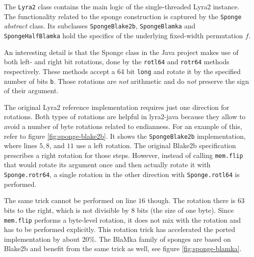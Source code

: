 The \texttt{Lyra2} class contains the main logic of the single-threaded Lyra2 instance. The functionality related to the sponge construction is captured by the \texttt{Sponge} \emph{abstract} class. Its subclasses \texttt{SpongeBlake2b}, \texttt{SpongeBlamka} and \texttt{SpongeHalfBlamka} hold the specifics of the underlying fixed-width permutation \(f\).

An interesting detail is that the Sponge class in the Java project makes use of both left- and right bit rotations, done by the \texttt{rotl64} and \texttt{rotr64} methods respectively. These methods accept a 64 bit \texttt{long} and rotate it by the specified number of bits \texttt{b}. Those rotations are \emph{not} arithmetic and do \emph{not} preserve the sign of their argument.

The original Lyra2 reference implementation requires just one direction for rotations. Both types of rotations are helpful in lyra2-java because they allow to avoid a number of byte rotations related to endianness. For an example of this,  refer to figure \ref{fig:sponge-blake2b}. It shows the \texttt{SpongeBlake2b} implementation, where lines \(5, 8\), and \(11\) use a left rotation. The original Blake2b specification prescribes a right rotation for those steps. However, instead of calling \texttt{mem.flip} that would rotate its argument once and then actually rotate it with \texttt{Sponge.rotr64}, a single rotation in the other direction with \texttt{Sponge.rotl64} is performed.

The same trick cannot be performed on line \(16\) though. The rotation there is \(63\) bits to the right, which is not divisible by 8 bits (the size of one byte). Since \texttt{mem.flip} performs a byte-level rotation, it does not mix with the rotation and has to be performed explicitly. This rotation trick has accelerated the ported implementation by about 20\%. The BlaMka family of sponges are based on Blake2b and benefit from the same trick as well, see figure \ref{fig:sponge-blamka}.

